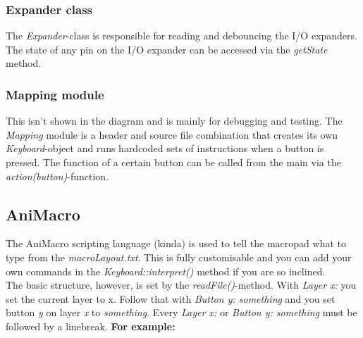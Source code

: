 \documentclass[english, 12pt]{scrartcl}
\begin{document}
	\subsubsection{Expander class}
	The \textit{Expander}-class is responsible for reading and debouncing the I/O expanders. The state of any pin on the I/O expander can be accessed via the \textit{getState} method.
	\subsubsection{Mapping module}
	This isn't shown in the diagram and is mainly for debugging and testing. The \textit{Mapping} module is a header and source file combination that creates its own \textit{Keyboard}-object and runs hardcoded sets of instructions when a button is pressed. The function of a certain button can be called from the main via the \textit{action(button)}-function.
	\subsection{AniMacro}
	The AniMacro scripting language (kinda) is used to tell the macropad what to type from the \textit{macroLayout.txt}. This is fully customisable and you can add your own commands in the \textit{Keyboard::interpret()} method if you are so inclined.\\
	The basic structure, however, is set by the \textit{readFile()}-method. With \textit{Layer x:} you set the current layer to x. Follow that with \textit{Button y: something} and you set button \textit{y} on layer \textit{x} to \textit{something}. Every \textit{Layer x:} or \textit{Button y: something} must be followed by a linebreak.\newline
	\textbf{For example:}\newline
	\noindent{}\newline
\end{document}

